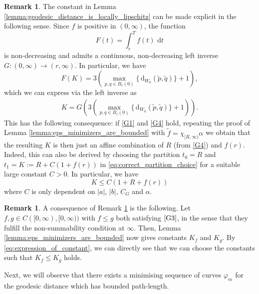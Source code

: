 \documentclass[a4paper, 11pt, reqno]{amsart}
\theoremstyle{plain}
\theoremstyle{definition}
\newtheorem{remark}[theorem]{Remark}
\theoremstyle{remark}
\newcommand{\dd}{\,\mathrm{d}}
\begin{document}
\begin{remark}\label{remark:geodesic_parameter_discussion_1}
    The constant in Lemma \ref{lemma:geodesic_distance_is_locally_lipschitz} can be made explicit in the following sense. Since $f$ is positive in $(0,\infty)$, the function 
    $$F(t) = \int_r^T f(t) \, \mathrm \dd t$$
    is non-decreasing and admits a continuous, non-decreasing left inverse $G\colon(0,\infty) \to (r, \infty)$. In particular, we have 
    \[
        F(K) = 3\left(\max_{p,q \in B_r(0)}\{\dd_{W_0}(\tilde p, \tilde q)\} + 1 \right),
    \]
    which we can express via the left inverse as
    \begin{align}\label{eq:expression_of_constant}
        K = G\left(3\left(\max_{p,q \in B_r(0)}\{\dd_{W_0}(\tilde p, \tilde q)\} + 1 \right)\right).
    \end{align}
    This has the following consequence: if \ref{G1} and \ref{G4} hold, repeating the proof of Lemma \ref{lemma:eps_minimizers_are_bounded} with $\tilde f = \chi_{[R, \infty)}\alpha$ we obtain that the resulting $K$ is then just an affine combination of $R$ (from \ref{G4}) and $f(r)$. Indeed, this can also be derived by choosing the partition $t_0 = R$ and $t_1 = K := R + C(1 + f(r))$ in \eqref{eq:correct_partition_choice} for a suitable large constant $C > 0$. In particular, we have
    \[
        K \leq C(1 + R + f(r)) 
    \]
    where $C$ is only dependent on $|a|$, $|b|$, $C_G$ and $\alpha$. 
\end{remark}

\begin{remark}\label{remark:geodesic_parameter_discussion_2}
    A consequence of Remark \ref{remark:geodesic_parameter_discussion_1} is the following. Let $f, g \in C([0,\infty), [0,\infty))$ with $f \leq g$ both satisfying $\ref{G3}$, in the sense that they fulfill the non-summability condition at $\infty$. Then, Lemma \ref{lemma:eps_minimizers_are_bounded} now gives constants $K_f$ and $K_g$. By \eqref{eq:expression_of_constant}, we can directly see that we can choose the constants such that $K_f \leq K_g$ holds.
\end{remark}

Next, we will observe that there exists a minimising sequence of curves $\varphi_m$ for the geodesic distance which has bounded path-length.
\end{document}
